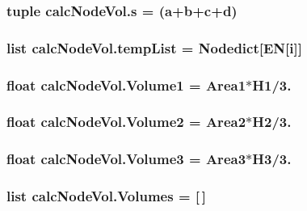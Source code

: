\subsubsection[{s}]{\setlength{\rightskip}{0pt plus 5cm}tuple calc\+Node\+Vol.\+s = ({\bf a}+{\bf b}+{\bf c}+{\bf d})}\label{namespacecalcNodeVol_ad515c670133cb128abbbee303eec6972}
\hypertarget{namespacecalcNodeVol_a32b776abb876317e4cab23ec290e7d89}{}
\subsubsection[{temp\+List}]{\setlength{\rightskip}{0pt plus 5cm}list calc\+Node\+Vol.\+temp\+List = {\bf Nodedict}\mbox{[}{\bf E\+N}\mbox{[}{\bf i}\mbox{]}\mbox{]}}\label{namespacecalcNodeVol_a32b776abb876317e4cab23ec290e7d89}
\hypertarget{namespacecalcNodeVol_ae39ff7c72b5b838ab99d403e7b55c025}{}
\subsubsection[{Volume1}]{\setlength{\rightskip}{0pt plus 5cm}float calc\+Node\+Vol.\+Volume1 = {\bf Area1}$\ast${\bf H1}/3.}\label{namespacecalcNodeVol_ae39ff7c72b5b838ab99d403e7b55c025}
\hypertarget{namespacecalcNodeVol_a3d57644a359754de1375f4d82bf96f3c}{}
\subsubsection[{Volume2}]{\setlength{\rightskip}{0pt plus 5cm}float calc\+Node\+Vol.\+Volume2 = {\bf Area2}$\ast${\bf H2}/3.}\label{namespacecalcNodeVol_a3d57644a359754de1375f4d82bf96f3c}
\hypertarget{namespacecalcNodeVol_a36e73b596402a4bf4002ba9a12fad717}{}
\subsubsection[{Volume3}]{\setlength{\rightskip}{0pt plus 5cm}float calc\+Node\+Vol.\+Volume3 = {\bf Area3}$\ast${\bf H3}/3.}\label{namespacecalcNodeVol_a36e73b596402a4bf4002ba9a12fad717}
\hypertarget{namespacecalcNodeVol_a7ea05a776ac9145d45d713f70d1cda16}{}
\subsubsection[{Volumes}]{\setlength{\rightskip}{0pt plus 5cm}list calc\+Node\+Vol.\+Volumes = \mbox{[}$\,$\mbox{]}}\label{namespacecalcNodeVol_a7ea05a776ac9145d45d713f70d1cda16}
